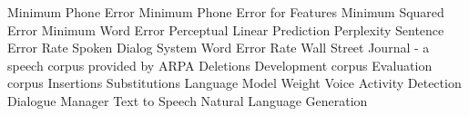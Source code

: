 \begin{acronym}[TDMA]
     {Minimum Phone Error}
     {Minimum Phone Error for Features}
     {Minimum Squared Error}
     {Minimum Word Error}
     {Perceptual Linear Prediction}
     {Perplexity}
     {Sentence Error Rate}
     {Spoken Dialog System}
     {Word Error Rate}
     {Wall Street Journal - a speech corpus provided by ARPA}
     {Deletions}
     {Development corpus}
     {Evaluation corpus}
     {Insertions}
     {Substitutions}
     {Language Model Weight}
     {Voice Activity Detection}
     {Dialogue Manager}
     {Text to Speech}
     {Natural Language Generation}
\end{acronym}

